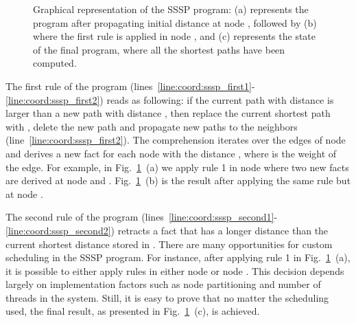 \begin{figure}
\begin{center}
\begin{subfigure}[b]{0.49\textwidth}
      \caption{}
   \end{subfigure}
\end{center}

\caption{Graphical representation of the SSSP program: (a) represents the
   program after propagating initial distance at node , followed by (b)
   where the first rule is applied in node , and (c) represents the
   state of the final program, where all the shortest paths have been computed.}

\label{fig:shortest_path_program}
\end{figure}

The first rule of the program
(lines~\ref{line:coord:sssp_first1}-\ref{line:coord:sssp_first2}) reads as
following: if the current  path  with distance 
is larger than a new path  with distance , then replace the
current shortest path with , delete the new  path and
propagate new paths to the neighbors
(line~\ref{line:coord:sssp_first2}). The comprehension iterates
over the edges of node  and derives a new  fact for each
node  with the distance , where  is the weight of
the edge. For example, in Fig.~\ref{fig:shortest_path_program}~(a) we apply rule
1 in node  where two new  facts are derived at node
 and . Fig.~\ref{fig:shortest_path_program}~(b) is the result
after applying the same rule but at node .

The second rule of the program
(lines~\ref{line:coord:sssp_second1}-\ref{line:coord:sssp_second2}) retracts a
 fact that has a longer distance than the current shortest distance
stored in . There are many opportunities for custom scheduling
in the SSSP program. For instance, after applying rule 1 in
Fig.~\ref{fig:shortest_path_program}~(a), it is possible to either apply rules
in either node  or node .  This decision depends largely on
implementation factors such as node partitioning and number of threads in the
system. Still, it is easy to prove that no matter the scheduling used, the final
result, as presented in Fig.~\ref{fig:shortest_path_program}~(c), is achieved.

